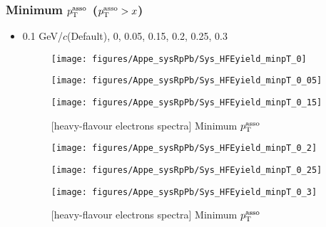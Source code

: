  
 \subsubsection{Minimum $p_{\rm{T}}^{\rm{asso}}$ ($p_{\rm{T}}^{\rm{asso}} > x$)}
\label{subsub:appe_sys_RpPb_MinpT}

 \begin{itemize}
      \item 0.1 GeV/$c$(Default), 0, 0.05, 0.15, 0.2, 0.25, 0.3 
      
      \begin{figure}[H]
      	\begin{minipage}{0.33\hsize} 
      	\begin{center}
      	\texttt{[image: figures/Appe\_sysRpPb/Sys\_HFEyield\_minpT\_0]}
      	\end{center}
      	\end{minipage}
      	\begin{minipage}{0.33\hsize} 
      	\begin{center}
      	\texttt{[image: figures/Appe\_sysRpPb/Sys\_HFEyield\_minpT\_0\_05]}
      	\end{center}
      	\end{minipage}
      	\begin{minipage}{0.33\hsize} 
      	\begin{center}
      	\texttt{[image: figures/Appe\_sysRpPb/Sys\_HFEyield\_minpT\_0\_15]}
      	\end{center}
      	\end{minipage}
      \caption{[heavy-flavour electrons spectra] Minimum $p_{\rm{T}}^{\rm{asso}}$}
      \label{fig:Sys_MinpT}
      \end{figure}
      
            \begin{figure}[H]
      	\begin{minipage}{0.33\hsize} 
      	\begin{center}
      	\texttt{[image: figures/Appe\_sysRpPb/Sys\_HFEyield\_minpT\_0\_2]}
      	\end{center}
      	\end{minipage}
      	\begin{minipage}{0.33\hsize} 
      	\begin{center}
      	\texttt{[image: figures/Appe\_sysRpPb/Sys\_HFEyield\_minpT\_0\_25]}
      	\end{center}
      	\end{minipage}
      	\begin{minipage}{0.33\hsize} 
      	\begin{center}
      	\texttt{[image: figures/Appe\_sysRpPb/Sys\_HFEyield\_minpT\_0\_3]}
      	\end{center}
      	\end{minipage}
      \caption{[heavy-flavour electrons spectra] Minimum $p_{\rm{T}}^{\rm{asso}}$}
      \label{fig:Sys_MinpT}
      \end{figure}
      

\end{itemize}
